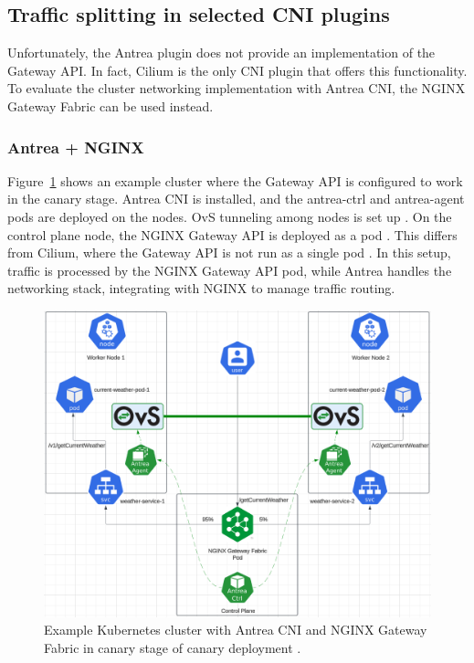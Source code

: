 
\subsection{Traffic splitting in selected CNI plugins}
\label{subsection:trafficSplitting}

Unfortunately, the Antrea plugin does not provide an implementation of the Gateway API. In fact, Cilium is the only CNI plugin that offers this functionality. To evaluate the cluster networking implementation with Antrea CNI, the NGINX Gateway Fabric can be used instead.



\subsubsection{Antrea + NGINX}
\label{subsection:antreaIngress}

Figure~\ref{fig:canaryAntreaImg} shows an example cluster where the Gateway API is configured to work in the canary stage. Antrea CNI is installed, and the antrea-ctrl and antrea-agent pods are deployed on the nodes. OvS tunneling among nodes is set up \cite{Antrea}. On the control plane node, the NGINX Gateway API is deployed as a pod \cite{NGINX}. This differs from Cilium, where the Gateway API is not run as a single pod \cite{CiliumGatewayAPI}. In this setup, traffic is processed by the NGINX Gateway API pod, while Antrea handles the networking stack, integrating with NGINX to manage traffic routing.

\begin{figure}[H]
    \centering
    \includegraphics[width=1\columnwidth]{images/antrea-nginx.png}
    \caption{Example Kubernetes cluster with Antrea CNI and NGINX Gateway Fabric in canary stage of canary deployment \cite{KubernetesArch}\cite{K8sIcons}\cite{LucidApp}\cite{AntreaEgressArch}.}
    \label{fig:canaryAntreaImg}
\end{figure}


